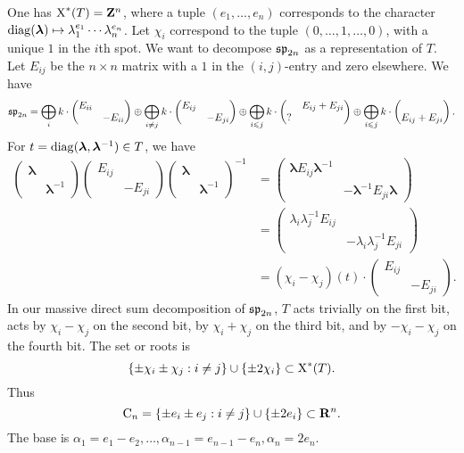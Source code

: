 \begin{example}
One has $\operatorname{X}^\ast(T)=\mathbf{Z}^n$, where a tuple $(e_1,\dots,e_n)$ corresponds 
to the character 
$\operatorname{diag}(\bm \lambda)\mapsto \lambda_1^{e_1}\dotsm \lambda_n^{e_n}$. Let 
$\chi_i$ correspond to the tuple $(0,\dots,1,\dots,0)$, with a unique $1$ in 
the $i$th spot. We want to decompose $\mathfrak{sp}_{2n}$ as a representation of $T$. 
Let $E_{i j}$ be the $n\times n$ matrix with a $1$ in the $(i,j)$-entry and 
zero elsewhere. We have 
\[
  \mathfrak{sp}_{2n} = \bigoplus_i k\cdot \begin{pmatrix} E_{i i} \\ & -E_{i i}\end{pmatrix} \oplus \bigoplus_{i\ne j} k\cdot \begin{pmatrix} E_{i j} \\ & -E_{j i} \end{pmatrix} \oplus \bigoplus_{i\leqslant j} k\cdot\begin{pmatrix} & E_{i j}+E_{j i} \\ ?\end{pmatrix} \oplus \bigoplus_{i\leqslant j} k\cdot\begin{pmatrix} \\ E_{i j}+E_{j i} \end{pmatrix}.
\]
For $t=\operatorname{diag}(\bm\lambda,\bm\lambda^{-1})\in T$, we have 
\begin{align*}
  \begin{pmatrix} \bm\lambda \\ & \bm\lambda^{-1} \end{pmatrix} \begin{pmatrix} E_{i j} \\ & -E_{j i} \end{pmatrix} \begin{pmatrix} \bm\lambda \\ & \bm\lambda^{-1}\end{pmatrix}^{-1} 
    &= \begin{pmatrix} \bm\lambda E_{i j}\bm \lambda^{-1} \\ & -\bm\lambda^{-1} E_{j i} \bm \lambda\end{pmatrix} \\ 
    &= \begin{pmatrix} \lambda_i \lambda_j^{-1} E_{i j} \\ & - \lambda_i\lambda_j^{-1} E_{j i} \end{pmatrix} \\
    &= (\chi_i-\chi_j)(t)\cdot \begin{pmatrix} E_{i j} \\ & -E_{j i} \end{pmatrix}.
\end{align*}
In our massive direct sum decomposition of $\mathfrak{sp}_{2n}$, $T$ acts trivially 
on the first bit, acts by $\chi_i-\chi_j$ on the second bit, by 
$\chi_i+\chi_j$ on the third bit, and by $-\chi_i-\chi_j$ on the fourth bit. 
The set or roots is 
\[
  \{\pm \chi_i\pm \chi_j:i\ne j\}\cup\{\pm 2\chi_i\}\subset \operatorname{X}^\ast(T) .
\]
Thus 
\[
  \mathrm{C}_n = \{\pm e_i\pm e_j:i\ne j\}\cup \{\pm 2 e_i\}\subset \mathbf{R}^n .
\]
The base is 
$\alpha_1=e_1-e_2,\dots,\alpha_{n-1} = e_{n-1}-e_n,\alpha_n=2 e_n$. 


\end{example}
